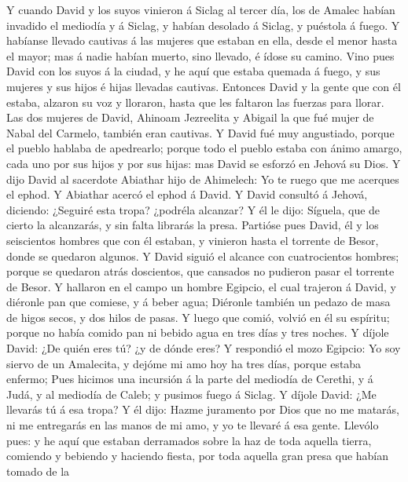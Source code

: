  Y cuando David y los suyos vinieron á Siclag al tercer día,
los de Amalec habían invadido el mediodía y á Siclag, y habían desolado
á Siclag, y puéstola á fuego.  Y habíanse llevado cautivas á
las mujeres que estaban en ella, desde el menor hasta el mayor; mas á
nadie habían muerto, sino llevado, é ídose su camino.  Vino
pues David con los suyos á la ciudad, y he aquí que estaba quemada á
fuego, y sus mujeres y sus hijos é hijas llevadas cautivas. 
Entonces David y la gente que con él estaba, alzaron su voz y lloraron,
hasta que les faltaron las fuerzas para llorar.  Las dos
mujeres de David, Ahinoam Jezreelita y Abigail la que fué mujer de Nabal
del Carmelo, también eran cautivas.  Y David fué muy
angustiado, porque el pueblo hablaba de apedrearlo; porque todo el
pueblo estaba con ánimo amargo, cada uno por sus hijos y por sus hijas:
mas David se esforzó en Jehová su Dios.  Y dijo David al
sacerdote Abiathar hijo de Ahimelech: Yo te ruego que me acerques el
ephod. Y Abiathar acercó el ephod á David.  Y David consultó
á Jehová, diciendo: ¿Seguiré esta tropa? ¿podréla alcanzar? Y él le
dijo: Síguela, que de cierto la alcanzarás, y sin falta librarás la
presa.  Partióse pues David, él y los seiscientos hombres
que con él estaban, y vinieron hasta el torrente de Besor, donde se
quedaron algunos.  Y David siguió el alcance con
cuatrocientos hombres; porque se quedaron atrás doscientos, que cansados
no pudieron pasar el torrente de Besor.  Y hallaron en el
campo un hombre Egipcio, el cual trajeron á David, y diéronle pan que
comiese, y á beber agua;  Diéronle también un pedazo de
masa de higos secos, y dos hilos de pasas. Y luego que comió, volvió en
él su espíritu; porque no había comido pan ni bebido agua en tres días y
tres noches.  Y díjole David: ¿De quién eres tú? ¿y de
dónde eres? Y respondió el mozo Egipcio: Yo soy siervo de un Amalecita,
y dejóme mi amo hoy ha tres días, porque estaba enfermo; 
Pues hicimos una incursión á la parte del mediodía de Cerethi, y á Judá,
y al mediodía de Caleb; y pusimos fuego á Siclag.  Y díjole
David: ¿Me llevarás tú á esa tropa? Y él dijo: Hazme juramento por Dios
que no me matarás, ni me entregarás en las manos de mi amo, y yo te
llevaré á esa gente.  Llevólo pues: y he aquí que estaban
derramados sobre la haz de toda aquella tierra, comiendo y bebiendo y
haciendo fiesta, por toda aquella gran presa que habían tomado de la
